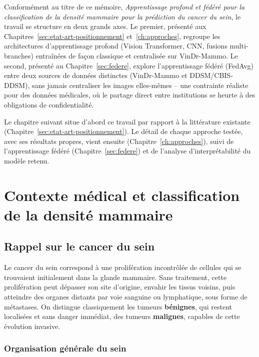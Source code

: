 \documentclass[12pt,a4paper]{report}
\begin{document}
Conformément au titre de ce mémoire, \emph{Apprentissage profond et fédéré
pour la classification de la densité mammaire pour la prédiction du cancer
du sein}, le travail se structure en deux grands axes. Le premier, présenté
aux Chapitres~\ref{sec:etat-art-positionnement} et~\ref{ch:approches},
regroupe les architectures d'apprentissage profond (Vision Transformer,
CNN, fusions multi-branches) entraînées de façon classique et centralisée
sur VinDr-Mammo. Le second, présenté au Chapitre~\ref{sec:federe}, explore
l'apprentissage fédéré (FedAvg) entre deux sources de données distinctes
(VinDr-Mammo et DDSM/CBIS-DDSM), sans jamais centraliser les images
elles-mêmes -- une contrainte réaliste pour des données médicales, où le
partage direct entre institutions se heurte à des obligations de
confidentialité.

Le chapitre suivant situe d'abord ce travail par rapport à la littérature
existante (Chapitre~\ref{sec:etat-art-positionnement}). Le détail de chaque
approche testée, avec ses résultats propres, vient ensuite
(Chapitre~\ref{ch:approches}), suivi de l'apprentissage fédéré
(Chapitre~\ref{sec:federe}) et de l'analyse d'interprétabilité du modèle
retenu.

\chapter{Contexte médical et classification de la densité mammaire}
\label{ch:contexte-medical}

\section{Rappel sur le cancer du sein}

Le cancer du sein correspond à une prolifération incontrôlée de cellules qui
se trouvaient initialement dans la glande mammaire. Sans traitement, cette
prolifération peut dépasser son site d'origine, envahir les tissus voisins,
puis atteindre des organes distants par voie sanguine ou lymphatique, sous
forme de métastases. On distingue classiquement les tumeurs
\textbf{bénignes}, qui restent localisées et sans danger immédiat, des
tumeurs \textbf{malignes}, capables de cette évolution invasive.

\subsection{Organisation générale du sein}
\end{document}
